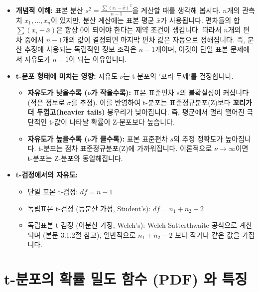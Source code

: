 \documentclass[
  letterpaper,
]{book}
\providecommand{\tightlist}{%
  \setlength{\itemsep}{0pt}\setlength{\parskip}{0pt}}
\begin{document}
\begin{itemize}
\tightlist
\item
  \textbf{개념적 이해:} 표본 분산
  \(s^2 = \frac{\sum(x_i - \bar{x})^2}{n-1}\)을 계산할 때를 생각해
  봅시다. \(n\)개의 관측치 \(x_1, ..., x_n\)이 있지만, 분산 계산에는
  표본 평균 \(\bar{x}\)가 사용됩니다. 편차들의 합
  \(\sum(x_i - \bar{x})\)은 항상 0이 되어야 한다는 제약 조건이 생깁니다.
  따라서 \(n\)개의 편차 중에서 \(n-1\)개의 값이 결정되면 마지막 편차
  값은 자동으로 정해집니다. 즉, 분산 추정에 사용되는 독립적인 정보
  조각은 \(n-1\)개이며, 이것이 단일 표본 문제에서 자유도가 \(n-1\)이
  되는 이유입니다.
\item
  \textbf{t-분포 형태에 미치는 영향:} 자유도 \(\nu\)는 t-분포의 '꼬리
  두께'를 결정합니다.

  \begin{itemize}
  \tightlist
  \item
    \textbf{자유도가 낮을수록 (\(\nu\)가 작을수록):} 표본 표준편차
    \(s\)의 불확실성이 커집니다 (적은 정보로 \(\sigma\)를 추정). 이를
    반영하여 t-분포는 표준정규분포(Z)보다 \textbf{꼬리가 더
    두껍고(heavier tails)} 봉우리가 낮아집니다. 즉, 평균에서 멀리 떨어진
    극단적인 t-값이 나타날 확률이 Z-분포보다 높습니다.
  \item
    \textbf{자유도가 높을수록 (\(\nu\)가 클수록):} 표본 표준편차 \(s\)의
    추정 정확도가 높아집니다. t-분포는 점차 표준정규분포(Z)에
    가까워집니다. 이론적으로 \(\nu \to \infty\)이면 t-분포는 Z-분포와
    동일해집니다.
  \end{itemize}
\item
  \textbf{t-검정에서의 자유도:}

  \begin{itemize}
  \tightlist
  \item
    단일 표본 t-검정: \(df = n - 1\)
  \item
    독립표본 t-검정 (등분산 가정, Student's): \(df = n_1 + n_2 - 2\)
  \item
    독립표본 t-검정 (이분산 가정, Welch's): Welch-Satterthwaite 공식으로
    계산되며 (본문 3.1.2절 참고), 일반적으로 \(n_1+n_2-2\) 보다 작거나
    같은 값을 가집니다.
  \end{itemize}
\end{itemize}

\chapter{t-분포의 확률 밀도 함수 (PDF) 와
특징}\label{t-uxbd84uxd3ecuxc758-uxd655uxb960-uxbc00uxb3c4-uxd568uxc218-pdf-uxc640-uxd2b9uxc9d5}
\end{document}
